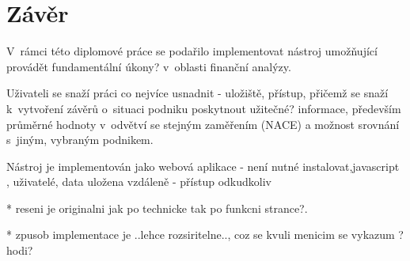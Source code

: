 \chapter{Závěr}
V~rámci této diplomové práce se podařilo implementovat nástroj umožňující provádět fundamentální úkony? v~oblasti finanční analýzy.

Uživateli se snaží práci co nejvíce usnadnit - uložiště, přístup, přičemž se snaží k~vytvoření závěrů o~situaci podniku poskytnout užitečné? informace, především průměrné hodnoty v~odvětví se stejným zaměřením (NACE) a možnost srovnání s~jiným, vybraným podnikem.

Nástroj je implementován jako webová aplikace - není nutné instalovat,javascript , uživatelé, data uložena vzdáleně - přístup odkudkoliv

* reseni je originalni jak po technicke tak po funkcni strance?. 

* zpusob implementace je ..lehce rozsiritelne.., coz se kvuli menicim se vykazum ?hodi?

